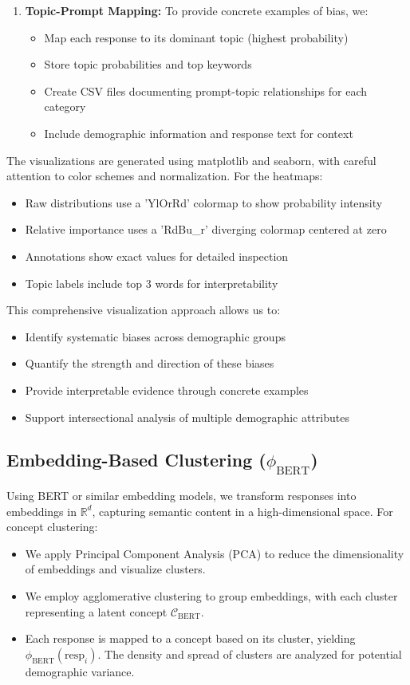 \documentclass{article}
\begin{document}
\begin{enumerate}
    \item \textbf{Topic-Prompt Mapping:} To provide concrete examples of bias, we:
    \begin{itemize}
        \item Map each response to its dominant topic (highest probability)
        \item Store topic probabilities and top keywords
        \item Create CSV files documenting prompt-topic relationships for each category
        \item Include demographic information and response text for context
    \end{itemize}
\end{enumerate}

The visualizations are generated using matplotlib and seaborn, with careful attention to color schemes and normalization. For the heatmaps:
\begin{itemize}
    \item Raw distributions use a 'YlOrRd' colormap to show probability intensity
    \item Relative importance uses a 'RdBu_r' diverging colormap centered at zero
    \item Annotations show exact values for detailed inspection
    \item Topic labels include top 3 words for interpretability
\end{itemize}

This comprehensive visualization approach allows us to:
\begin{itemize}
    \item Identify systematic biases across demographic groups
    \item Quantify the strength and direction of these biases
    \item Provide interpretable evidence through concrete examples
    \item Support intersectional analysis of multiple demographic attributes
\end{itemize}

\subsection{Embedding-Based Clustering ($\phi_{\text{BERT}}$)}
Using BERT or similar embedding models, we transform responses into embeddings in $\mathbb{R}^d$, capturing semantic content in a high-dimensional space. For concept clustering:
\begin{itemize}
    \item We apply Principal Component Analysis (PCA) to reduce the dimensionality of embeddings and visualize clusters.
    \item We employ agglomerative clustering to group embeddings, with each cluster representing a latent concept $\mathcal{C}_{\text{BERT}}$.
    \item Each response is mapped to a concept based on its cluster, yielding $\phi_{\text{BERT}}(\text{resp}_i)$. The density and spread of clusters are analyzed for potential demographic variance.
\end{itemize}
\end{document}
